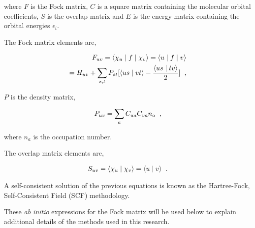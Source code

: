 \noindent where $F$ is the Fock matrix, $C$ is a square matrix containing the molecular orbital coefficients, $S$ is the overlap matrix and $E$ is the energy matrix containing the orbital energies $\epsilon_i$.

The Fock matrix elements are,

\begin{gather}
{\begin{split}
F_{uv}=\langle\chi_u \mid f \mid \chi_v \rangle = \langle u \mid f \mid v \rangle \\
= H_{uv}+ \sum_{s,t} P_{st}[\langle us \mid vt \rangle - \frac{ \langle us \mid tv \rangle}{2} ]\hspace{0.2cm},
\end{split}}
\end{gather}

$P$ is the density matrix,

\begin{gather}
P_{uv}=\sum_{a}C_{ua}C_{va}n_a\hspace{0.2cm},
\end{gather}

\noindent where $n_a$ is the occupation number.

The overlap matrix elements are,

\begin{gather}
S_{uv}=\langle\chi_u\mid\chi_v\rangle=\langle u \mid  v \rangle\hspace{0.2cm}.
\end{gather}

A self-consistent solution of the previous equations is known as the Hartree-Fock, Self-Consistent Field (SCF) methodology.

These {\it ab initio} expressions for the Fock matrix will be used below to explain additional details of the methods used in this research.

